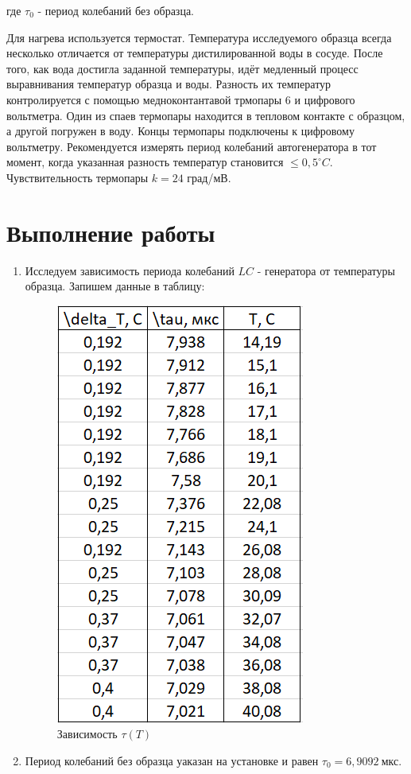 \documentclass[a4paper, 12pt]{article}%
\begin{document}
где $\tau_0$ - период колебаний без образца.

\vspace{0.5cm}

Для нагрева используется термостат. Температура исследуемого образца всегда несколько отличается от температуры дистилированной воды в сосуде. После того, как вода достигла заданной температуры, идёт медленный процесс выравнивания температур образца и воды. Разность их температур контролируется с помощью медноконтантавой трмопары 6 и цифрового вольтметра. Один из спаев термопары находится в тепловом контакте с образцом, а другой погружен в воду. Концы термопары подключены к цифровому вольтметру. Рекомендуется измерять период колебаний автогенератора в тот момент, когда указанная разность температур становится $\leq 0,5^{\circ} C$. Чувствительность термопары $k = 24$ град/мВ.

\section*{Выполнение работы}

\begin{enumerate}

\item Исследуем зависимость периода колебаний $LC$ - генератора от температуры образца. Запишем данные в таблицу:

\begin{figure}[h!]
\centering
\includegraphics[scale = 0.8]{images/table_t(T).png}
\caption{Зависимость $\tau (T)$}
\label{fig:Image3}
\end{figure}

\item Период колебаний без образца уаказан на установке и равен $\tau_0 = 6,9092 \: \text{мкс}$.



\end{enumerate}
\end{document}
